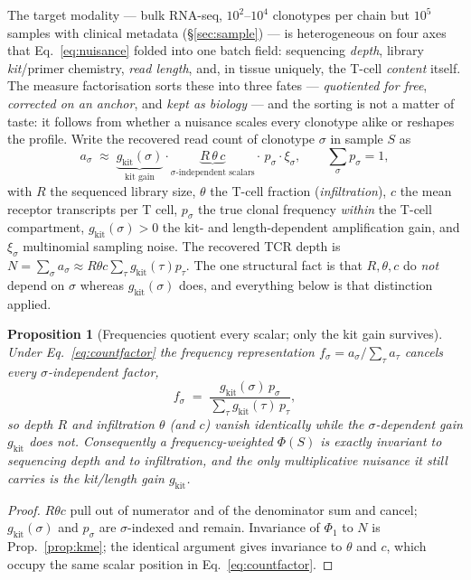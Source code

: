 \documentclass[11pt]{article}
\theoremstyle{oldplain}
\newtheorem{proposition}{Proposition}
\theoremstyle{oldrem}
\begin{document}
The target modality --- bulk {\scshape RNA}-seq, $10^2$--$10^4$ clonotypes per chain but $10^5$ samples with
clinical metadata (\S\ref{sec:sample}) --- is heterogeneous on four axes that Eq.~\eqref{eq:nuisance} folded
into one batch field: sequencing \emph{depth}, library \emph{kit}/primer chemistry, \emph{read length}, and, in
tissue uniquely, the T-cell \emph{content} itself. The measure factorisation sorts these into three fates ---
\emph{quotiented for free}, \emph{corrected on an anchor}, and \emph{kept as biology} --- and the sorting is not
a matter of taste: it follows from whether a nuisance scales every clonotype alike or reshapes the profile.
Write the recovered read count of clonotype $\sigma$ in sample $S$ as
\begin{equation}\label{eq:countfactor}
  a_\sigma \;\approx\; \underbrace{g_{\mathrm{kit}}(\sigma)}_{\text{kit gain}}\cdot
  \underbrace{R\,\theta\,c}_{\text{$\sigma$-independent scalars}}\cdot\,p_\sigma\cdot\xi_\sigma,
  \qquad \textstyle\sum_\sigma p_\sigma=1,
\end{equation}
with $R$ the sequenced library size, $\theta$ the T-cell fraction (\emph{infiltration}), $c$ the mean receptor
transcripts per T cell, $p_\sigma$ the true clonal frequency \emph{within} the T-cell compartment, $g_{\mathrm{kit}}(\sigma)>0$
the kit- and length-dependent amplification gain, and $\xi_\sigma$ multinomial sampling noise. The recovered
{\scshape TCR} depth is $N=\sum_\sigma a_\sigma\approx R\theta c\sum_\tau g_{\mathrm{kit}}(\tau)p_\tau$. The one structural fact
is that $R,\theta,c$ do \emph{not} depend on $\sigma$ whereas $g_{\mathrm{kit}}(\sigma)$ does, and everything below is that
distinction applied.

\begin{proposition}[Frequencies quotient every scalar; only the kit gain survives]\label{prop:freqquotient}
Under Eq.~\eqref{eq:countfactor} the frequency representation $f_\sigma=a_\sigma/\sum_\tau a_\tau$ cancels every
$\sigma$-independent factor,
\begin{equation}\label{eq:freqquotient}
  f_\sigma \;=\; \frac{g_{\mathrm{kit}}(\sigma)\,p_\sigma}{\sum_\tau g_{\mathrm{kit}}(\tau)\,p_\tau},
\end{equation}
so depth $R$ \emph{and} infiltration $\theta$ (and $c$) vanish identically while the $\sigma$-dependent gain
$g_{\mathrm{kit}}$ does not. Consequently a frequency-weighted $\Phi(S)$ is exactly invariant to sequencing depth
and to infiltration, and the \emph{only} multiplicative nuisance it still carries is the kit/length gain
$g_{\mathrm{kit}}$.
\end{proposition}
\begin{proof}
$R\theta c$ pull out of numerator and of the denominator sum and cancel; $g_{\mathrm{kit}}(\sigma)$ and $p_\sigma$ are
$\sigma$-indexed and remain. Invariance of $\Phi_1$ to $N$ is Prop.~\ref{prop:kme}; the identical argument gives
invariance to $\theta$ and $c$, which occupy the same scalar position in Eq.~\eqref{eq:countfactor}. \end{proof}
\end{document}
